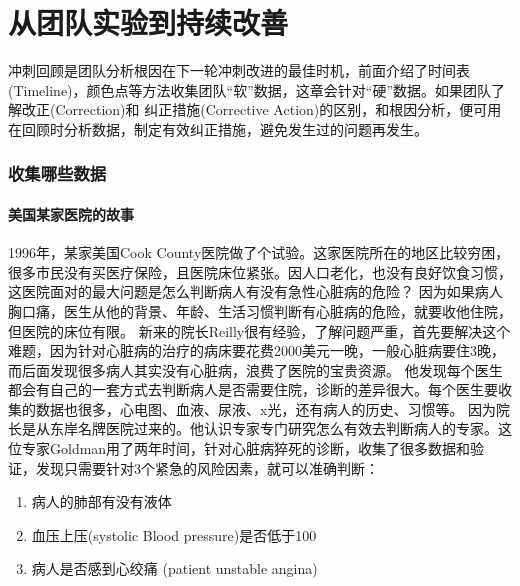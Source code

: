\chapter{从团队实验到持续改善} %



冲刺回顾是团队分析根因在下一轮冲刺改进的最佳时机，前面介绍了时间表(Timeline)，颜色点等方法收集团队“软”数据，这章会针对“硬”数据。如果团队了解改正(Correction)和 纠正措施(Corrective Action)的区别，和根因分析，便可用在回顾时分析数据，制定有效纠正措施，避免发生过的问题再发生。

\hypertarget{ux6536ux96c6ux54eaux4e9bux6570ux636e}{%
\subsection{收集哪些数据}\label{ux6536ux96c6ux54eaux4e9bux6570ux636e}}

\hypertarget{ux7f8eux56fdux67d0ux5bb6ux533bux9662ux7684ux6545ux4e8b}{%
\subsubsection{美国某家医院的故事}\label{ux7f8eux56fdux67d0ux5bb6ux533bux9662ux7684ux6545ux4e8b}}

1996年，某家美国Cook
County医院做了个试验。这家医院所在的地区比较穷困，很多市民没有买医疗保险，且医院床位紧张。因人口老化，也没有良好饮食习惯，这医院面对的最大问题是怎么判断病人有没有急性心脏病的危险？
因为如果病人胸口痛，医生从他的背景、年龄、生活习惯判断有心脏病的危险，就要收他住院，但医院的床位有限。
新来的院长Reilly很有经验，了解问题严重，首先要解决这个难题，因为针对心脏病的治疗的病床要花费2000美元一晚，一般心脏病要住3晚，而后面发现很多病人其实没有心脏病，浪费了医院的宝贵资源。
他发现每个医生都会有自己的一套方式去判断病人是否需要住院，诊断的差异很大。每个医生要收集的数据也很多，心电图、血液、尿液、x光，还有病人的历史、习惯等。
因为院长是从东岸名牌医院过来的。他认识专家专门研究怎么有效去判断病人的专家。这位专家Goldman用了两年时间，针对心脏病猝死的诊断，收集了很多数据和验证，发现只需要针对3个紧急的风险因素，就可以准确判断：

\begin{enumerate}
\tightlist
\item
  病人的肺部有没有液体
\item
  血压上压(systolic Blood pressure)是否低于100
\item
  病人是否感到心绞痛 (patient unstable angina)
\end{enumerate}

